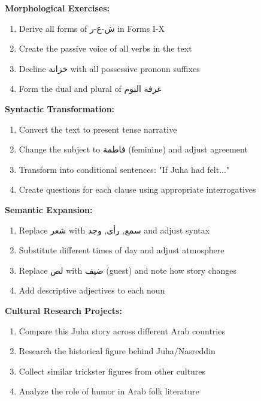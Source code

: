 \documentclass[letter,12pt]{article}
\begin{document}
\begin{tcolorbox}[colback=boxcolor,colframe=headercolor,title=\textbf{Practice Activities},breakable]
\textbf{Morphological Exercises:}
\begin{enumerate}
\item Derive all forms of \textarabic{ش-ع-ر} in Forms I-X
\item Create the passive voice of all verbs in the text
\item Decline \textarabic{خزانة} with all possessive pronoun suffixes
\item Form the dual and plural of \textarabic{غرفة البوم}
\end{enumerate}

\textbf{Syntactic Transformation:}
\begin{enumerate}
\item Convert the text to present tense narrative
\item Change the subject to \textarabic{فاطمة} (feminine) and adjust agreement
\item Transform into conditional sentences: "If Juha had felt..."
\item Create questions for each clause using appropriate interrogatives
\end{enumerate}

\textbf{Semantic Expansion:}
\begin{enumerate}
\item Replace \textarabic{شعر} with \textarabic{سمع}, \textarabic{رأى}, \textarabic{وجد} and adjust syntax
\item Substitute different times of day and adjust atmosphere
\item Replace \textarabic{لص} with \textarabic{ضيف} (guest) and note how story changes
\item Add descriptive adjectives to each noun
\end{enumerate}

\textbf{Cultural Research Projects:}
\begin{enumerate}
\item Compare this Juha story across different Arab countries
\item Research the historical figure behind Juha/Nasreddin
\item Collect similar trickster figures from other cultures
\item Analyze the role of humor in Arab folk literature
\end{enumerate}
\end{tcolorbox}
\end{document}
